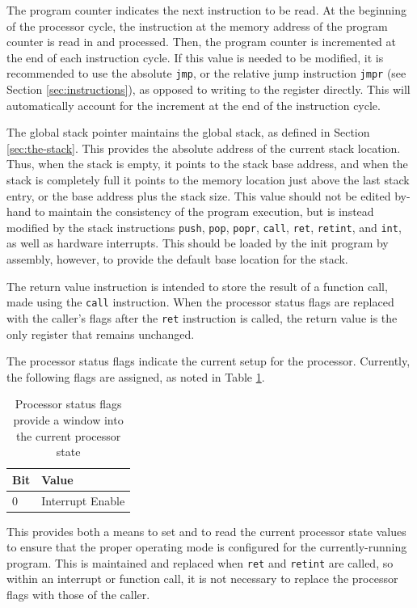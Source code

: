 \documentclass{article}
\begin{document}
The program counter indicates the next instruction to be read. At the beginning of the processor cycle, the instruction at the memory address of the program counter is read in and processed. Then, the program counter is incremented at the end of each instruction cycle. If this value is needed to be modified, it is recommended to use the absolute \texttt{jmp}, or the relative jump instruction \texttt{jmpr} (see Section \ref{sec:instructions}), as opposed to writing to the register directly. This will automatically account for the increment at the end of the instruction cycle.

The global stack pointer maintains the global stack, as defined in Section \ref{sec:the-stack}. This provides the absolute address of the current stack location. Thus, when the stack is empty, it points to the stack base address, and when the stack is completely full it points to the memory location just above the last stack entry, or the base address plus the stack size. This value should not be edited by-hand to maintain the consistency of the program execution, but is instead modified by the stack instructions \texttt{push}, \texttt{pop}, \texttt{popr}, \texttt{call}, \texttt{ret}, \texttt{retint}, and \texttt{int}, as well as hardware interrupts. This should be loaded by the init program by assembly, however, to provide the default base location for the stack.

The return value instruction is intended to store the result of a function call, made using the \texttt{call} instruction. When the processor status flags are replaced with the caller's flags after the \texttt{ret} instruction is called, the return value is the only register that remains unchanged.

The processor status flags indicate the current setup for the processor. Currently, the following flags are assigned, as noted in Table \ref{table:processor-flags}.

\begin{table}[h!]
    \centering
    \begin{tabular}{l|l}
        \hline
        Bit & Value \\
        \hline
        0 & Interrupt Enable \\
        \hline
    \end{tabular}
    \caption{Processor status flags provide a window into the current processor state}
    \label{table:processor-flags}
\end{table}

This provides both a means to set and to read the current processor state values to ensure that the proper operating mode is configured for the currently-running program. This is maintained and replaced when \texttt{ret} and \texttt{retint} are called, so within an interrupt or function call, it is not necessary to replace the processor flags with those of the caller.
\end{document}
